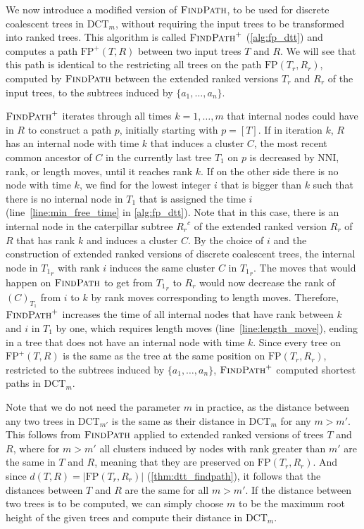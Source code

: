 \documentclass[11pt]{amsart}
\newcommand{\findpath}{\textsc{FindPath}}
\newcommand{\nni}{\mathrm{NNI}}
\newcommand{\fp}{\mathrm{FP}}
\newcommand{\dct}{\mathrm{DCT}}
\begin{document}
We now introduce a modified version of $\findpath$, to be used for discrete coalescent trees in $\dct_m$, without requiring the input trees to be transformed into ranked trees.
This algorithm is called $\findpath^+$ (\autoref{alg:fp_dtt}) and computes a path $\fp^+(T,R)$ between two input trees $T$ and $R$.
We will see that this path is identical to the restricting all trees on the path $\fp(T_r,R_r)$, computed by $\findpath$ between the extended ranked versions $T_r$ and $R_r$ of the input trees, to the subtrees induced by $\{a_1, \ldots, a_n\}$.

$\findpath^+$ iterates through all times $k = 1, \ldots, m$ that internal nodes could have in $R$ to construct a path $p$, initially starting with $p = [T]$.
If in iteration $k$, $R$ has an internal node with time $k$ that induces a cluster $C$, the most recent common ancestor of $C$ in the currently last tree $T_1$ on $p$ is decreased by $\nni$, rank, or length moves, until it reaches rank $k$.
If on the other side there is no node with time $k$, we find for the lowest integer $i$ that is bigger than $k$ such that there is no internal node in $T_1$ that is assigned the time $i$ (line~\ref{line:min_free_time} in \autoref{alg:fp_dtt}).
Note that in this case, there is an internal node in the caterpillar subtree ${R_r}^c$ of the extended ranked version $R_r$ of $R$ that has rank $k$ and induces a cluster $C$.
By the choice of $i$ and the construction of extended ranked versions of discrete coalescent trees, the internal node in ${T_1}_r$ with rank $i$ induces the same cluster $C$ in ${T_1}_r$.
The moves that would happen on $\findpath$ to get from ${T_1}_r$ to $R_r$ would now decrease the rank of $(C)_{T_1}$ from $i$ to $k$ by rank moves corresponding to length moves.
Therefore, $\findpath^+$ increases the time of all internal nodes that have rank between $k$ and $i$ in $T_1$ by one, which requires length moves (line~\ref{line:length_move}), ending in a tree that does not have an internal node with time $k$.
Since every tree on $\fp^+(T,R)$ is the same as the tree at the same position on $\fp(T_r,R_r)$, restricted to the subtrees induced by $\{a_1, \ldots, a_n\}$, $\findpath^+$ computed shortest paths in $\dct_m$.

Note that we do not need the parameter $m$ in practice, as the distance between any two trees in $\dct_{m'}$ is the same as their distance in $\dct_m$ for any $m > m'$.
This follows from $\findpath$ applied to extended ranked versions of trees $T$ and $R$, where for $m>m'$ all clusters induced by nodes with rank greater than $m'$ are the same in $T$ and $R$, meaning that they are preserved on $\fp(T_r,R_r)$.
And since $d(T,R) = |\fp(T_r,R_r)|$ (\autoref{thm:dtt_findpath}), it follows that the distances between $T$ and $R$ are the same for all $m > m'$.
If the distance between two trees is to be computed, we can simply choose $m$ to be the maximum root height of the given trees and compute their distance in $\dct_m$.
\end{document}
